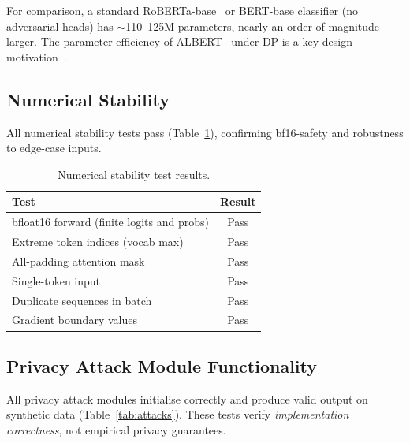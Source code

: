\documentclass{article}
\begin{document}
For comparison, a standard RoBERTa-base~\cite{devlin2019bert} or BERT-base
classifier (no adversarial heads) has $\sim$110--125M parameters, nearly an
order of magnitude larger. The parameter efficiency of ALBERT~\cite{lan2020albert}
under DP is a key design motivation~\cite{bueno2025privacy}.

\subsection{Numerical Stability}

All numerical stability tests pass (Table~\ref{tab:numerics}),
confirming bf16-safety and robustness to edge-case inputs.

\begin{table}[h]
  \centering
  \caption{Numerical stability test results.}
  \label{tab:numerics}
  \begin{tabular}{lc}
    \toprule
    \textbf{Test} & \textbf{Result} \\
    \midrule
    bfloat16 forward (finite logits and probs) & Pass \\
    Extreme token indices (vocab max) & Pass \\
    All-padding attention mask & Pass \\
    Single-token input & Pass \\
    Duplicate sequences in batch & Pass \\
    Gradient boundary values & Pass \\
    \bottomrule
  \end{tabular}
\end{table}

\subsection{Privacy Attack Module Functionality}

All privacy attack modules initialise correctly and produce valid
output on synthetic data (Table~\ref{tab:attacks}).
These tests verify \emph{implementation correctness}, not empirical
privacy guarantees.
\end{document}
